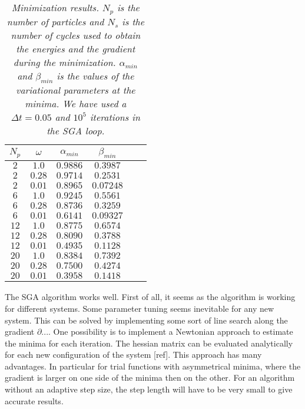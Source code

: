 \documentclass[a4paper,10pt,twocolumn]{article} %
\begin{document}
\begin{table}[h!]
\begin{center}
\begin{tabular}{|c|c|c|c|c|c|}
\hline
$N_{p}$ & $\omega$ & $\alpha_{min}$ & $\beta_{min}$ \\ 
\hline
\hline
 $2$  & $1.0$ 	& $0.9886$ & $0.3987$ \\ 
 $2$  & $0.28$  & $0.9714$ & $0.2531$ \\ 
 $2$  & $0.01$  & $0.8965$ & $0.07248$ \\ 	 
\hline
 $6$  & $1.0$ 	& $0.9245$ & $0.5561$ \\ 
 $6$  & $0.28$  & $0.8736$ & $0.3259$ \\ 
 $6$  & $0.01$  & $0.6141$ & $0.09327$ \\ 
\hline
 $12$ & $1.0$ 	& $0.8775$ & $0.6574$ \\ 
 $12$ & $0.28$  & $0.8090$ & $0.3788$ \\ 
 $12$ & $0.01$  & $0.4935$ & $0.1128$ \\ 
\hline
 $20$ & $1.0 $ 	& $0.8384$ & $0.7392$ \\ 
 $20$ & $0.28$  & $0.7500$ & $0.4274$ \\ 
 $20$ & $0.01$  & $0.3958$ & $0.1418$ \\ 
\hline
\end{tabular}
\end{center}
\caption{{\it 
	Minimization results. $N_p$ is the number of particles and $N_s$ is the number of cycles used to obtain the energies and the gradient during the minimization.
	$\alpha_{min}$ and $\beta_{min}$ is the values of the variational parameters at the minima. 
	We have used a $\Delta t=0.05$ and $10^5$ iterations in the SGA loop. 
}}
\label{tab1}
\end{table}


The SGA algorithm works well. First of all, it seems as the algorithm is working for different systems. Some parameter tuning seems inevitable for any new system. This can be solved by implementing
some sort of line search along the gradient $\partial ...$. One possibility is to implement a Newtonian approach to estimate the minima for each iteration. The hessian matrix can be evaluated 
analytically for each new configuration of the system [ref]. This approach has many advantages. In particular for trial functions with asymmetrical minima, 
where the gradient is larger on one side of the minima then on the other. For an algorithm without an adaptive step size, the step length will have to be very small to give accurate results.
\end{document}
